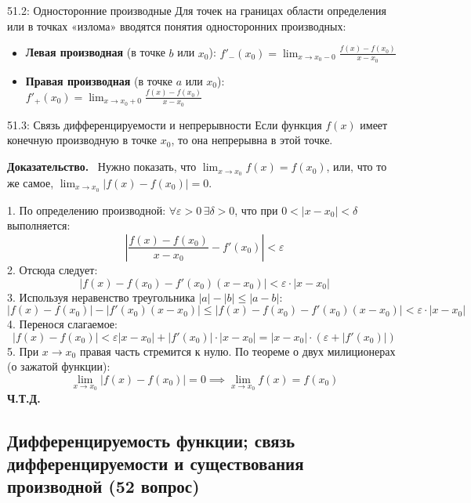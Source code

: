 \documentclass[a4paper,12pt]{article}
\newcommand{\myproof}{\textbf{Доказательство.}\ }
\begin{document}
	\begin{definitionbox}{51.2: Односторонние производные}
		Для точек на границах области определения или в точках «излома» вводятся понятия односторонних производных:
		\begin{itemize}
			\item \textbf{Левая производная} (в точке $b$ или $x_0$): 
			$f'_{-}(x_0) = \lim_{x \to x_0 - 0} \frac{f(x) - f(x_0)}{x - x_0}$
			\item \textbf{Правая производная} (в точке $a$ или $x_0$): 
			$f'_{+}(x_0) = \lim_{x \to x_0 + 0} \frac{f(x) - f(x_0)}{x - x_0}$
		\end{itemize}
	\end{definitionbox}
	
	
	\vspace{1cm}
	\begin{theorembox}{51.3: Связь дифференцируемости и непрерывности}
		Если функция $f(x)$ имеет конечную производную в точке $x_0$, то она непрерывна в этой точке.
	\end{theorembox}
	
	\vspace{0.5cm}
	\myproof
	Нужно показать, что $\lim_{x \to x_0} f(x) = f(x_0)$, или, что то же самое, $\lim_{x \to x_0} |f(x) - f(x_0)| = 0$.
	
	1. По определению производной: $\forall \varepsilon > 0 \, \exists \delta > 0$, что при $0 < |x - x_0| < \delta$ выполняется:
	$$ \left| \frac{f(x) - f(x_0)}{x - x_0} - f'(x_0) \right| < \varepsilon $$
	2. Отсюда следует:
	$$ |f(x) - f(x_0) - f'(x_0)(x - x_0)| < \varepsilon \cdot |x - x_0| $$
	3. Используя неравенство треугольника $|a| - |b| \leq |a - b|$:
	$$ |f(x) - f(x_0)| - |f'(x_0)(x - x_0)| \leq |f(x) - f(x_0) - f'(x_0)(x - x_0)| < \varepsilon \cdot |x - x_0| $$
	4. Перенося слагаемое:
	$$ |f(x) - f(x_0)| < \varepsilon |x - x_0| + |f'(x_0)| \cdot |x - x_0| = |x - x_0| \cdot (\varepsilon + |f'(x_0)|) $$
	5. При $x \to x_0$ правая часть стремится к нулю. По теореме о двух милиционерах (о зажатой функции):
	$$ \lim_{x \to x_0} |f(x) - f(x_0)| = 0 \implies \lim_{x \to x_0} f(x) = f(x_0) $$
	\textbf{Ч.Т.Д.}
	
	
	
	
	
	
	\vspace{1cm}
	\subsection{Дифференцируемость функции; связь дифференцируемости и существования производной (52 вопрос)}
	
\end{document}
